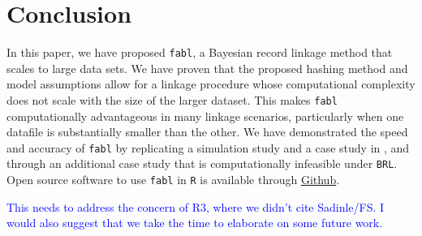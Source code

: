 \documentclass[ba]{imsart}
\begin{document}
	
	\section{Conclusion}
	\label{discussion}
	
	In this paper, we have proposed \texttt{fabl}, a Bayesian record linkage method that scales to large data sets. We have proven that the proposed hashing method
	and model assumptions allow for a linkage procedure whose computational complexity does not scale with the size of the larger dataset. This makes \texttt{fabl} computationally advantageous in many linkage scenarios, particularly when one datafile is substantially smaller than the other. We have demonstrated the speed and accuracy of \texttt{fabl} by replicating a simulation study and a case study in \cite{sadinle_bayesian_2017}, and through an additional case study that is computationally infeasible under \texttt{BRL}. Open source software to use \texttt{fabl} in \texttt{R} is available through \href{https://github.com/briankundinger/parlrdev}{Github}.

\textcolor{blue}{This needs to address the concern of R3, where we didn't cite Sadinle/FS. I would also suggest that we take the time to elaborate on some future work.}	
	
\end{document}
